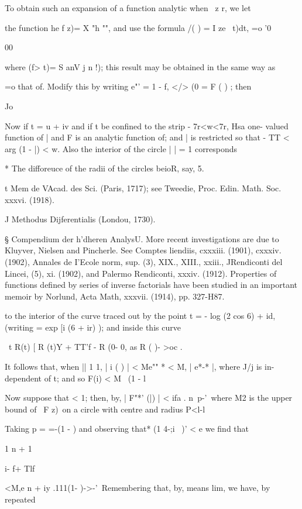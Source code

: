 {To obtain such an expansion of a function analytic when \ z r, we let

the function he f z)= X "h "", and use the formula /( ) = I ze~ t)dt,
=o '0

00

where (f> t)= S anV j n !); this result may be obtained in the same
way as

 =o that of. Modify this by writing e"' = 1 - f, </> (0 = F ( )
; then

Jo

Now if t = u + iv and if t be confined to the strip - 7r<w<7r, Hsa
one- valued function of | and F is an analytic function of; and | is
restricted so that - TT < arg (1 - |) < w. Also the interior of the
circle | | = 1 corresponds

* The difforeuce of the radii of the circles beioR, say, 5.

t Mem de VAcad. des Sci. (Paris, 1717); see Tweedie, Proc. Edin. Math.
Soc. xxxvi. (1918).

J Methodus Dijferentialis (Londou, 1730).

§ Compendium der h'dheren AnalysU. More recent investigations are due
to Kluyver, Nielsen and Pincherle. See Comptes liendiis, cxxxiii.
(1901), cxxxiv. (1902), Annales de I'Ecole norm, sup. (3), XIX.,
XIII., xxiii., JRendiconti del Lincei, (5), xi. (1902), and Palermo
Rendiconti, xxxiv. (1912). Properties of functions defined by series
of inverse factorials have been studied in an important memoir by
Norlund, Acta Math, xxxvii. (1914), pp. 327-H87.
%
%

to the interior of the curve traced out by the point t = - log (2 cos
6) + id, (writing = exp [i (6 + ir) ); and inside this curve

\ t R(t) [ R (t)Y + TT'f - R (0- 0, as R ( )- >oc .

It follows that, when || 1 1, | i ( ) | < Me"" * < M, | e*-* |, where
J/j is in- dependent of t; and so F(i) < M \ (1 - l

Now suppose that < 1; then, by, | F"*' (|) | < ifa . n\ p-'\
where M2 is the upper bound of \ F z)\ on a circle with centre and
radius P<l-l

Taking p = =-(1 - ) and observing that* (1 4-;i~ )' < e we find that

1 n + 1

i- f+ Tlf

<M,e n + iy .111(1- )->-'\ Remembering that, by, means lim, we
have, by repeated

}
